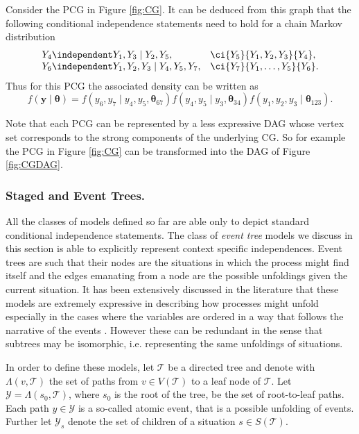 \begin{example}
Consider the \gls{PCG} in Figure \ref{fig:CG}. It can be deduced from this graph that the following conditional independence statements need to hold for a chain Markov distribution
\begin{equation*}
\begin{array}{ll}
Y_4\independent Y_1,Y_3\;|\; Y_2,Y_5,& \ci{Y_5}{Y_1,Y_2,Y_3}{Y_4}, \\
 Y_6\independent Y_1,Y_2,Y_3\;|\; Y_4,Y_5,Y_7,& \ci{Y_7}{Y_1,\dots,Y_5}{Y_6}.
\end{array}
\label{eq:examplechainindependence}
\end{equation*}
Thus for this \gls{PCG} the associated density can be written as
\begin{equation*}
\label{eq:chainexamplefactorization}
f(\bm{y}\;|\; \bm{\theta})=f(y_6,y_7\;|\; y_4,y_5, \bm{\theta}_{67})f(y_4,y_5\;|\; y_3, \bm{\theta}_{34})f(y_1,y_2,y_3\;|\;\bm{\theta}_{123}).
\end{equation*}
\end{example}

Note that each \gls{PCG} can be represented by a less expressive \gls{DAG} whose vertex set corresponds to the strong components of the underlying \gls{CG}. So for example the \gls{PCG} in Figure \ref{fig:CG} can be transformed into the \gls{DAG} of Figure \ref{fig:CGDAG}.
 
\subsubsection{Staged and Event Trees.}
\label{sec:tree}
All the classes of models defined so far are able only to depict standard conditional independence statements. The class of \textit{event tree} models we discuss in this section is able to explicitly represent context specific independences.  Event trees are such that their nodes are the situations in which the process might find itself and the edges emanating from a node are the possible unfoldings given the current situation. It has been extensively discussed in the literature that these models are extremely expressive in describing how processes might unfold especially in the cases where the variables are ordered in a way that follows the narrative of the events \citep{Shafer1996, Freeman2011, Smith2010}. However these can be redundant in the sense that subtrees may be isomorphic, i.e. representing the same unfoldings of situations.
 
In order to define these models, let $\mathcal{T}$ be a directed tree and denote with $\Lambda(v,\mathcal{T})$ the set of paths from $v\in V(\mathcal{T})$ to a leaf node of $\mathcal{T}$. Let $\mathcal{Y}=\Lambda(s_0,\mathcal{T})$, where $s_0$ is the root of the tree, be the set of root-to-leaf paths. Each path $y\in\mathcal{Y}$ is a so-called atomic event, that is a possible unfolding of events. Further let $\mathcal{Y}_s$ denote the set of children of a situation $s\in S(\mathcal{T})$. 

